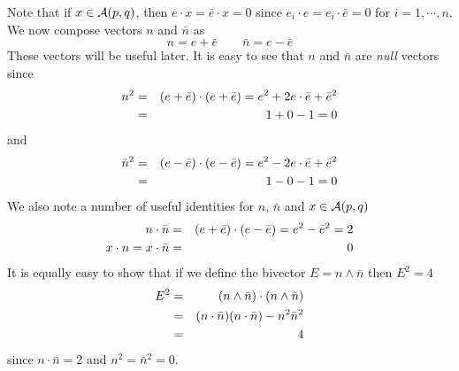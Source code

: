 Note that if $x \in {\mathcal{A}}(p,q)$, then $e\cdot x =
\bar{e}\cdot x = 0$ since $e_i\cdot e=e_i \cdot \bar{e} = 0$
for $i=1,\cdots,n$. We now compose vectors $n$ and
$\bar{n}$ as
%
\[ n = e + \bar{e}  \qquad  \bar{n} = e - \bar{e} 
\label{nequations}
\]
%
These vectors will be useful later. It is easy to see that
$n$ and $\bar{n}$ are \emph{null} vectors since
%
\begin{eqnarray}
n^2  & = & (e + \bar{e})\cdot(e + \bar{e}) = e^2 + 2e\cdot\bar{e} + \bar{e}^2 \nonumber \\
       & = &  1 + 0 - 1 = 0  \nonumber
\end{eqnarray}
and
\begin{eqnarray}
\bar{n}^2  & = & (e - \bar{e})\cdot(e - \bar{e}) = e^2 - 2e\cdot\bar{e} + \bar{e}^2 \nonumber \\
       & = &  1 - 0 - 1 = 0     \nonumber
\end{eqnarray}
%
We also note a number of useful identities for $n$, $\bar{n}$ and $x \in \mathcal{A}(p,q)$
%
\begin{eqnarray}
n\cdot\bar{n} & = & (e + \bar{e})\cdot(e - \bar{e}) = e^2 - \bar{e}^2 = 2 \nonumber \\
x\cdot n = x\cdot \bar{n} & = & 0 \nonumber 
\end{eqnarray}
%
It is equally easy to show that if we define the bivector $E = n \wedge \bar{n}$ 
then $E^2 = 4$
%
\begin{eqnarray}
  E^2 & = &  (n\wedge \bar{n})\cdot(n\wedge \bar{n}) \nonumber \\
  & = &  (n\cdot\bar{n})(n\cdot\bar{n}) - n^2 \bar{n}^2 \nonumber \\
  & = &  4
  \end{eqnarray}
since $n\cdot\bar{n}=2$ and $n^2=\bar{n}^2=0$.

